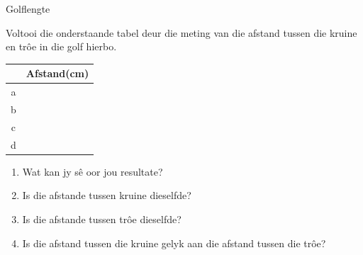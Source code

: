 \begin{definition}
\noindent
\label{m38806*secfhsst!!!underscore!!!id221}
            \begin{activity}{Golflengte}
            \nopagebreak
        \label{m38806*id318517}
    \setcounter{subfigure}{0}
	\begin{figure}[H] %
    \begin{center}
\end{center} \end{figure}       
        \par 
Voltooi die onderstaande tabel deur die meting van die afstand tussen die kruine en trôe in die
       golf hierbo.
\begin{center}
\begin{tabular}{|c|c|}\hline
&Afstand(cm)\\\hline
a&\\\hline
b&\\\hline
c&\\\hline
d&\\\hline
\end{tabular}
\end{center}
    \par
        \label{m38806*id318631}\begin{enumerate}[noitemsep, label=\textbf{\arabic*}. ] 
            \label{m38806*uid15}\item Wat kan jy s\^{e} oor jou resultate?
\label{m38806*uid16}\item Is die afstande tussen kruine dieselfde?
\label{m38806*uid17}\item Is die afstande tussen trôe dieselfde?
\label{m38806*uid18}\item Is die afstand tussen die kruine gelyk aan die afstand tussen die tr\^{o}e?
\end{enumerate}

\end{activity}


\end{definition}

